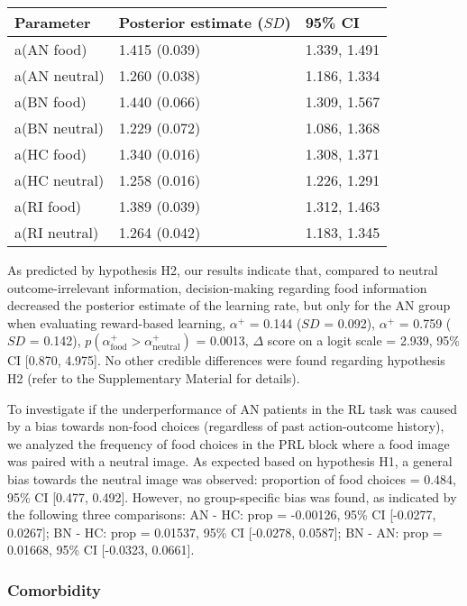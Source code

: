 \documentclass[
  man,floatsintext]{apa6}
\begin{document}
\begin{longtable}[]{@{}lll@{}}
\toprule()
Parameter & Posterior estimate (\(SD\)) & 95\% CI \\
\midrule()
\endhead
a(AN food) & 1.415 (0.039) & 1.339, 1.491 \\
a(AN neutral) & 1.260 (0.038) & 1.186, 1.334 \\
a(BN food) & 1.440 (0.066) & 1.309, 1.567 \\
a(BN neutral) & 1.229 (0.072) & 1.086, 1.368 \\
a(HC food) & 1.340 (0.016) & 1.308, 1.371 \\
a(HC neutral) & 1.258 (0.016) & 1.226, 1.291 \\
a(RI food) & 1.389 (0.039) & 1.312, 1.463 \\
a(RI neutral) & 1.264 (0.042) & 1.183, 1.345 \\
\bottomrule()
\end{longtable}

As predicted by hypothesis H2, our results indicate that, compared to neutral outcome-irrelevant information, decision-making regarding food information decreased the posterior estimate of the learning rate, but only for the AN group when evaluating reward-based learning, \(\alpha^+\) = 0.144 (\(SD\) = 0.092), \(\alpha^+\) = 0.759 (\(SD\) = 0.142), \(p(\alpha^+_\text{food} > \alpha^+_\text{neutral})\) = 0.0013, \(\Delta\) score on a logit scale = 2.939, 95\% CI {[}0.870, 4.975{]}. No other credible differences were found regarding hypothesis H2 (refer to the Supplementary Material for details).

To investigate if the underperformance of AN patients in the RL task was caused by a bias towards non-food choices (regardless of past action-outcome history), we analyzed the frequency of food choices in the PRL block where a food image was paired with a neutral image. As expected based on hypothesis H1, a general bias towards the neutral image was observed: proportion of food choices = 0.484, 95\% CI {[}0.477, 0.492{]}. However, no group-specific bias was found, as indicated by the following three comparisons: AN - HC: prop = -0.00126, 95\% CI {[}-0.0277, 0.0267{]}; BN - HC: prop = 0.01537, 95\% CI {[}-0.0278, 0.0587{]}; BN - AN: prop = 0.01668, 95\% CI {[}-0.0323, 0.0661{]}.

\hypertarget{comorbidity}{%
\subsubsection{Comorbidity}\label{comorbidity}}
\end{document}
